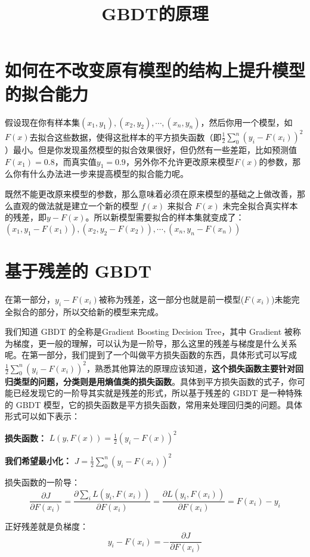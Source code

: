 \documentclass[12pt]{article}
\title{GBDT的原理\cite{Zhihu_Understanding_GBDT}\cite{Zhihu_Understanding_GBDT_2}}
\begin{document}
\maketitle

\section{如何在不改变原有模型的结构上提升模型的拟合能力}

假设现在你有样本集$(x_1,y_1),(x_2,y_2),\cdots,(x_n,y_n)$，然后你用一个模型，如$F(x)$去拟合这些数据，使得这批样本的平方损失函数（即$\frac{1}{2}\sum_0^n(y_i-F(x_i))^2$）最小。但是你发现虽然模型的拟合效果很好，但仍然有一些差距，比如预测值 $F(x_1)=0.8$，而真实值$y_1=0.9$，另外你不允许更改原来模型$F(x)$的参数，那么你有什么办法进一步来提高模型的拟合能力呢。

既然不能更改原来模型的参数，那么意味着必须在原来模型的基础之上做改善，那么直观的做法就是建立一个新的模型 $f(x)$ 来拟合 $F(x)$ 未完全拟合真实样本的残差，即$y-F(x)$。所以新模型需要拟合的样本集就变成了：$(x_1,y_1-F(x_1)),(x_2,y_2-F(x_2)),\cdots,(x_n,y_n-F(x_n))$

\section{基于残差的 GBDT}
在第一部分，$y_i-F(x_i)$被称为残差，这一部分也就是前一模型($F(x_i)$)未能完全拟合的部分，所以交给新的模型来完成。

我们知道 GBDT 的全称是Gradient Boosting Decision Tree，其中 Gradient 被称为梯度，更一般的理解，可以认为是一阶导，那么这里的残差与梯度是什么关系呢。在第一部分，我们提到了一个叫做平方损失函数的东西，具体形式可以写成$\frac{1}{2}\sum_0^n(y_i-F(x_i))^2$，熟悉其他算法的原理应该知道，\textbf{这个损失函数主要针对回归类型的问题，分类则是用熵值类的损失函数}。具体到平方损失函数的式子，你可能已经发现它的一阶导其实就是残差的形式，所以基于残差的 GBDT 是一种特殊的 GBDT 模型，它的损失函数是平方损失函数，常用来处理回归类的问题。具体形式可以如下表示：

\textbf{损失函数：} $L(y,F(x)) =\frac{1}{2}(y_i-F(x))^2 $

\textbf{我们希望最小化：} $J=\frac{1}{2}\sum_0^n(y_i-F(x_i))^2$

损失函数的一阶导：
$$\frac{\partial J}{\partial F(x_i)} = \frac{\partial \sum_iL(y_i,F(x_i))}{\partial F(x_i)}=\frac{\partial L(y_i,F(x_i))}{\partial F(x_i)} = F(x_i)-y_i$$

正好残差就是负梯度：
$$
y_i-F(x_i) = -\frac{\partial J}{\partial F(x_i)} 
$$
\end{document}
